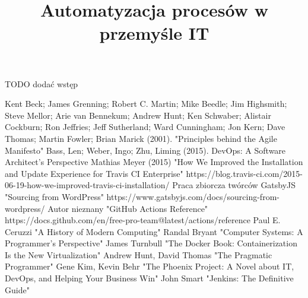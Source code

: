 \documentclass[twoside]{projektInzynierskiMS1}
\title{Automatyzacja procesów w przemyśle IT}
\begin{document}
TODO dodać wstęp









\begin{thebibliography}{12}

 Kent Beck; James Grenning; Robert C. Martin; Mike Beedle; Jim Highsmith; Steve Mellor; Arie van Bennekum; Andrew Hunt; Ken Schwaber; Alistair Cockburn; Ron Jeffries; Jeff Sutherland; Ward Cunningham; Jon Kern; Dave Thomas; Martin Fowler; Brian Marick (2001). "Principles behind the Agile Manifesto"
 Bass, Len; Weber, Ingo; Zhu, Liming (2015). DevOps: A Software Architect's Perspective
 Mathias Meyer (2015)  "How We Improved the Installation and Update Experience for Travis CI Enterprise" https://blog.travis-ci.com/2015-06-19-how-we-improved-travis-ci-installation/
 Praca zbiorcza twórców GatsbyJS "Sourcing from WordPress" https://www.gatsbyjs.com/docs/sourcing-from-wordpress/
 Autor nieznany "GitHub Actions Reference" https://docs.github.com/en/free-pro-team@latest/actions/reference
 Paul E. Ceruzzi "A History of Modern Computing"
 Randal Bryant "Computer Systems: A Programmer's Perspective"
 James Turnbull "The Docker Book: Containerization Is the New Virtualization"
 Andrew Hunt, David Thomas "The Pragmatic Programmer"
 Gene Kim, Kevin Behr "The Phoenix Project: A Novel about IT, DevOps, and Helping Your Business Win"
 John Smart "Jenkins: The Definitive Guide"

\end{thebibliography}
\end{document}
